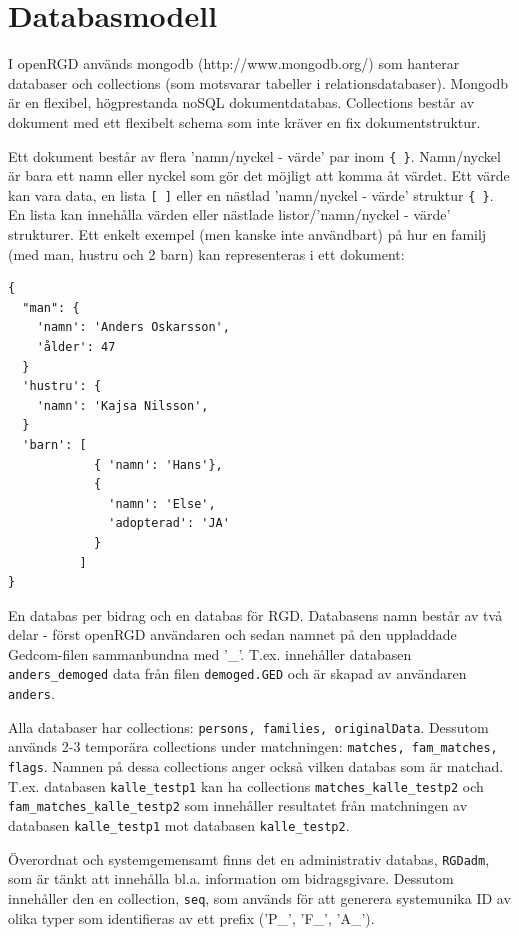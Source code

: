 \documentclass[swedish,11pt]{article}
\begin{document}
\section{Databasmodell}
I openRGD används mongodb (http://www.mongodb.org/) som hanterar databaser och collections (som
motsvarar tabeller i relationsdatabaser). Mongodb är en flexibel,
högprestanda noSQL dokumentdatabas. Collections består av dokument med
ett flexibelt schema som inte kräver en fix dokumentstruktur.

Ett dokument består av flera 'namn/nyckel - värde' par inom
\verb+{ }+. Namn/nyckel är bara ett namn eller nyckel som gör det
möjligt att komma åt värdet.
Ett värde kan vara data, en lista \verb+[ ]+ eller en nästlad
'namn/nyckel - värde' struktur \verb+{ }+. En lista kan innehålla
värden eller nästlade listor/'namn/nyckel - värde' strukturer. Ett enkelt exempel (men kanske
inte användbart) på hur en familj (med man, hustru och 2 barn) kan representeras i ett dokument:
\begin{verbatim}
{
  "man": {
    'namn': 'Anders Oskarsson',
    'ålder': 47
  }
  'hustru': {
    'namn': 'Kajsa Nilsson',
  }
  'barn': [
            { 'namn': 'Hans'},
            { 
              'namn': 'Else',
              'adopterad': 'JA'
            }
          ]
}              
\end{verbatim}

En databas per bidrag och en databas för RGD. Databasens namn består
av två delar - först openRGD användaren och sedan namnet på den
uppladdade Gedcom-filen sammanbundna med '\_'. T.ex. innehåller
databasen \verb+anders_demoged+ data från filen \verb+demoged.GED+ och
är skapad av användaren \verb+anders+.

Alla databaser har collections: \verb+persons, families, originalData+. Dessutom
används 2-3 temporära collections under matchningen:
\verb+matches, fam_matches, flags+. Namnen på dessa collections anger
också vilken databas som är matchad. T.ex. databasen
\verb+kalle_testp1+ kan ha collections \verb+matches_kalle_testp2+ och
\verb+fam_matches_kalle_testp2+ som innehåller resultatet från matchningen av databasen
\verb+kalle_testp1+ mot databasen \verb+kalle_testp2+.

Överordnat och systemgemensamt finns det en administrativ databas,
\verb+RGDadm+, som är tänkt att
innehålla bl.a. information om bidragsgivare. Dessutom innehåller den
en collection, \verb+seq+, som används för att generera systemunika ID av
olika typer som identifieras av ett prefix ('P\_', 'F\_', 'A\_').
\end{document}
